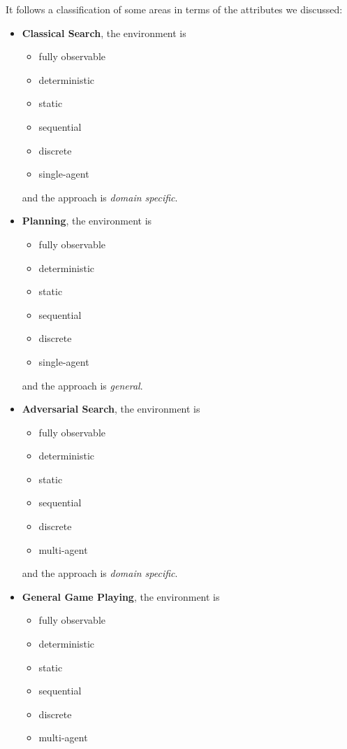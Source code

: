 \documentclass[10pt, letterpaper]{report}
\begin{document}
It follows a classification of some areas in terms of the attributes we discussed:\begin{itemize}
    \item \textbf{Classical Search}, the environment is\begin{itemize}
        \item fully observable
        \item deterministic
        \item static 
        \item sequential
        \item discrete
        \item single-agent
    \end{itemize}
    and the approach is \textit{domain specific}.
    \item \textbf{Planning}, the environment is\begin{itemize}
        \item fully observable
        \item deterministic
        \item static
        \item sequential 
        \item discrete
        \item single-agent
    \end{itemize}
    and the approach is \textit{general}.
    \item \textbf{Adversarial Search}, the environment is\begin{itemize}
        \item fully observable
        \item deterministic
        \item static 
        \item sequential    
        \item discrete
        \item multi-agent
    \end{itemize}
    and the approach is \textit{domain specific}.
    \item \textbf{General Game Playing}, the environment is\begin{itemize}
        \item fully observable
        \item deterministic
        \item static 
        \item sequential    
        \item discrete
        \item multi-agent

\end{itemize}
\end{itemize}
\end{document}
